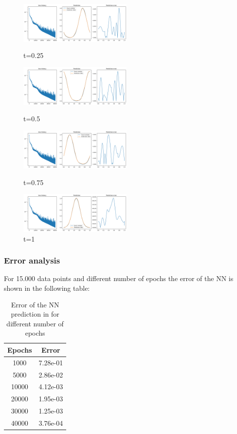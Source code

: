 \documentclass{article}
\begin{document}
\begin{figure}[!h]
    \centering
    \includegraphics[width=0.5\textwidth]{images/data2.png}
    \caption{t=0.25}
    \includegraphics[width=0.5\textwidth]{images/data3.png}
    \caption{t=0.5}
    \includegraphics[width=0.5\textwidth]{images/data4.png}
    \caption{t=0.75}
    \includegraphics[width=0.5\textwidth]{images/data5.png}
    \caption{t=1}
\end{figure} 

\subsubsection*{Error analysis}

For 15.000 data points and different number of epochs the error of the NN is shown in the following table:

\begin{table}[!h]
    \centering
    \begin{tabular}{|c|c|}
    \hline
    \textbf{Epochs} & \textbf{Error} \\ \hline
    1000            & 7.28e-01     \\ \hline
    5000            & 2.86e-02      \\ \hline
    10000           & 4.12e-03      \\ \hline   
    20000           & 1.95e-03       \\ \hline
    30000           & 1.25e-03        \\ \hline
    40000           & 3.76e-04       \\ \hline
    \end{tabular}
    \caption{Error of the NN prediction in for different number of epochs}
    \label{tab:my-table}
\end{table}
\end{document}
